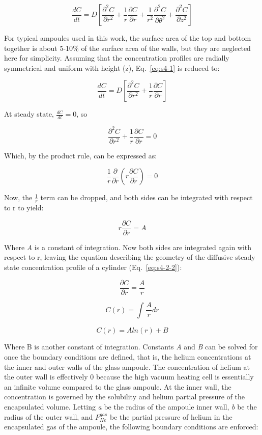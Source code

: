 \begin{equation}
\frac{dC}{dt} = D\left\lbrack \frac{\partial^{2}C}{\partial r^{2}} + \frac{1}{r}\frac{\partial C}{\partial r} + \frac{1}{r^{2}}\frac{\partial^{2}C}{\partial\theta^{2}} + \frac{\partial^{2}C}{\partial z^{2}} \right\rbrack
\label{eq:s4-1}
\end{equation}

For typical ampoules used in this work, the surface area of the top and
bottom together is about 5-10\% of the surface area of the walls, but
they are neglected here for simplicity. Assuming that the concentration
profiles are radially symmetrical and uniform with height (z), Eq.~\eqref{eq:s4-1}
is reduced to:

\begin{equation}
\frac{dC}{dt} = D\left\lbrack \frac{\partial^{2}C}{\partial r^{2}} + \frac{1}{r}\frac{\partial C}{\partial r} \right\rbrack
\label{eq:s4-2}
\end{equation}

At steady state, \(\frac{dC}{dt} = 0\), so

\[
\frac{\partial^{2}C}{\partial r^{2}} + \frac{1}{r}\frac{\partial C}{\partial r} = 0
\]

Which, by the product rule, can be expressed as:

\[
\frac{1}{r}\frac{\partial}{\partial r}\left( r\frac{\partial C}{\partial r} \right) = 0
\]

Now, the \(\frac{1}{r}\) term can be dropped, and both sides can be
integrated with respect to r to yield:

\[
r\frac{\partial C}{\partial r} = A
\]

Where \emph{A} is a constant of integration. Now both sides are
integrated again with respect to r, leaving the equation describing the
geometry of the diffusive steady state concentration profile of a
cylinder (Eq.~\eqref{eq:s4-2-2}):

\[\frac{\partial C}{\partial r} = \frac{A}{r}\]

\[C(r) = \int_{}^{}\frac{A}{r}dr\]

\begin{equation}
C(r) = Aln(r) + B
\label{eq:s4-2-2}
\end{equation}

Where B is another constant of integration. Constants \emph{A} and
\emph{B} can be solved for once the boundary conditions are defined,
that is, the helium concentrations at the inner and outer walls of the
glass ampoule. The concentration of helium at the outer wall is
effectively 0 because the high vacuum heating cell is essentially an
infinite volume compared to the glass ampoule. At the inner wall, the
concentration is governed by the solubility and helium partial pressure
of the encapsulated volume. Letting \emph{a} be the radius of the
ampoule inner wall, \emph{b} be the radius of the outer wall, and
\(P_{He}^{gas}\) be the partial pressure of helium in the encapsulated
gas of the ampoule, the following boundary conditions are enforced:

